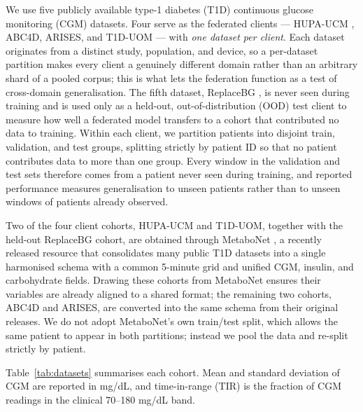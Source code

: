 \documentclass[10pt,letterpaper]{article}
\begin{document}
We use five publicly available type-1 diabetes (T1D) continuous glucose
monitoring (CGM) datasets. Four serve as the federated clients --- HUPA-UCM
\cite{hidalgo2024hupaucm}, ABC4D, ARISES, and T1D-UOM
\cite{alsuhaymi2025t1duom} --- with \emph{one dataset per client}. Each dataset
originates from a distinct study, population, and device, so a per-dataset
partition makes every client a genuinely different domain rather than an
arbitrary shard of a pooled corpus; this is what lets the federation function as
a test of cross-domain generalisation. The fifth dataset, ReplaceBG
\cite{aleppo2017replacebg}, is never seen during training and is used only as a
held-out, out-of-distribution (OOD) test client to measure how well a federated model transfers to a cohort that
contributed no data to training. Within each client, we partition patients
into disjoint train, validation, and test groups, splitting strictly by
patient ID so that no patient contributes data to more than one group. Every
window in the validation and test sets therefore comes from a patient never
seen during training, and reported performance measures generalisation to
unseen patients rather than to unseen windows of patients already observed.

Two of the four client cohorts, HUPA-UCM and T1D-UOM, together with the held-out
ReplaceBG cohort, are obtained through MetaboNet
\cite{wolff2026metabonet}, a recently released resource that consolidates many
public T1D datasets into a single harmonised schema with a common 5-minute grid
and unified CGM, insulin, and carbohydrate fields. Drawing these cohorts from
MetaboNet ensures their variables are already aligned to a shared format; the
remaining two cohorts, ABC4D and ARISES, are converted into the same schema
from their original releases. We do not adopt MetaboNet's own train/test split,
which allows the same patient to appear in both partitions; instead we pool the
data and re-split strictly by patient.

Table~\ref{tab:datasets} summarises each cohort. Mean and standard deviation of
CGM are reported in mg/dL, and time-in-range (TIR) is the fraction of CGM
readings in the clinical 70--180 mg/dL band.
\end{document}

